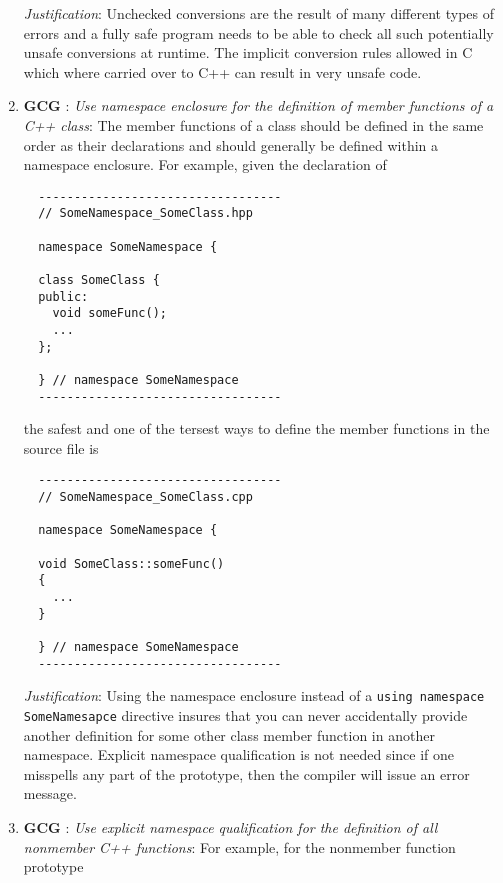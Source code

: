 \begin{enumerate}
{}\textit{Justification}: Unchecked conversions are the result of many
different types of errors and a fully safe program needs to be able to check
all such potentially unsafe conversions at runtime.  The implicit conversion
rules allowed in C which where carried over to C++ can result in very unsafe
code.

{}\item{}\textbf{GCG }:
{}\textit{Use namespace enclosure for the definition of member functions
of a C++ class}: The member functions of a class should be defined in the same
order as their declarations and should generally be defined within a namespace
enclosure.  For example, given the declaration of

{\small\begin{verbatim}
  ----------------------------------
  // SomeNamespace_SomeClass.hpp

  namespace SomeNamespace {

  class SomeClass {
  public:
    void someFunc();
    ...
  };

  } // namespace SomeNamespace
  ----------------------------------
\end{verbatim}}

the safest and one of the tersest ways to define the member functions in the
source file is

{\small\begin{verbatim}
  ----------------------------------
  // SomeNamespace_SomeClass.cpp

  namespace SomeNamespace {

  void SomeClass::someFunc()
  {
    ...
  }

  } // namespace SomeNamespace
  ----------------------------------
\end{verbatim}}

{}\textit{Justification}: Using the namespace enclosure instead of a
{}\texttt{using namespace SomeNamesapce} directive insures that you can never
accidentally provide another definition for some other class member function
in another namespace.  Explicit namespace qualification is not needed since if
one misspells any part of the prototype, then the compiler will issue an error
message.

{}\item{}\textbf{GCG }:
{}\textit{Use explicit namespace qualification for the definition of all
nonmember C++ functions}: For example, for the nonmember function prototype


\end{enumerate}
